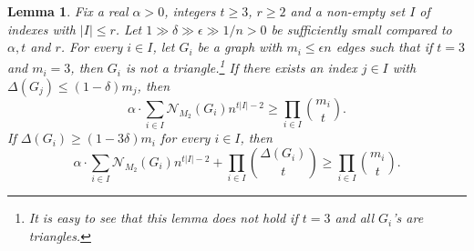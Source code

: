 \documentclass[10pt]{article}
\newtheorem{lemma}[theorem]{Lemma}
\begin{document}
\begin{lemma}\label{lem:for contain M2}
Fix a real $\alpha>0$, integers $t\geq 3$, $r\geq 2$ and a non-empty set $I$ of indexes with $|I|\leq r$.
Let $1\gg\delta\gg\epsilon\gg 1/n>0$ be sufficiently small compared to $\alpha, t$ and $r$.
For every $i\in I$, let $G_i$ be a graph with $m_i\leq \epsilon n$ edges such that if $t=3$ and $m_i=3$, then $G_i$ is not a triangle.\footnote{It is easy to see that this lemma does not hold if $t=3$ and all $G_i$'s are triangles.}
If there exists an index $j\in I$ with $\Delta(G_j)\leq (1- \delta)m_j$,
then
$$
\alpha\cdot\sum_{i\in I}  \mathcal{N}_{M_2}(G_i)n^{t|I|-2}  \geq \prod_{i\in I}{m_i \choose t}.
$$
If $\Delta(G_i)\geq (1- 3\delta)m_i$ for every $i\in I$, then
$$
\alpha\cdot\sum_{i\in I}  \mathcal{N}_{M_2}(G_i)n^{t|I|-2} + \prod_{i\in I}{\Delta(G_i)\choose t}\geq \prod_{i\in I}{m_i \choose t}.
$$
\end{lemma}
\end{document}
